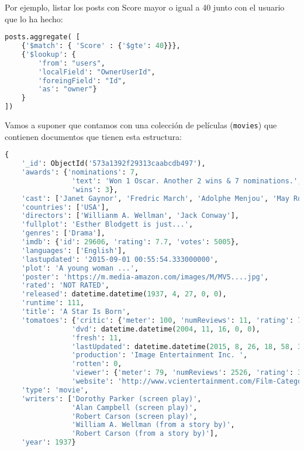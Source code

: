 Por ejemplo, listar los posts con Score mayor o igual a 40 junto con el usuario que lo ha hecho:
\begin{lstlisting}[language=python]
posts.aggregate( [
	{'$match': { 'Score' : {'$gte': 40}}},
	{'$lookup': {
		'from': "users",
		'localField': "OwnerUserId",
		'foreingField': "Id",
		'as': "owner"}
	}
])
\end{lstlisting}
Vamos a suponer que contamos con una colección de películas (\texttt{movies}) que contienen documentos que tienen esta estructura:
\begin{lstlisting}[language=python]
{
	'_id': ObjectId('573a1392f29313caabcdb497'),
	'awards': {'nominations': 7,
				'text': 'Won 1 Oscar. Another 2 wins & 7 nominations.',
				'wins': 3},
	'cast': ['Janet Gaynor', 'Fredric March', 'Adolphe Menjou', 'May Robson'],
	'countries': ['USA'],
	'directors': ['Willianm A. Wellman', 'Jack Conway'],
	'fullplot': 'Esther Blodgett is just...',
	'genres': ['Drama'],
	'imdb': {'id': 29606, 'rating': 7.7, 'votes': 5005},
	'languages': ['English'],
	'lastupdated': '2015-09-01 00:55:54.333000000',
	'plot': 'A young woman ...',
	'poster': 'https://m.media-amazon.com/images/M/MV5....jpg',
	'rated': 'NOT RATED',
	'released': datetime.datetime(1937, 4, 27, 0, 0),
	'runtime': 111,
	'title': 'A Star Is Born',
	'tomatoes': {'critic': {'meter': 100, 'numReviews': 11, 'rating': 7.4},
				'dvd': datetime.datetime(2004, 11, 16, 0, 0),
				'fresh': 11,
				'lastUpdated': datetime.datetime(2015, 8, 26, 18, 58, 34),
				'production': 'Image Entertainment Inc. ',
				'rotten': 0,
				'viewer': {'meter': 79, 'numReviews': 2526, 'rating': 3.6},
				'website': 'http://www.vcientertainment.com/Film-Categories?product_id=73'},
	'type': 'movie',
	'writers': ['Dorothy Parker (screen play)',
				'Alan Campbell (screen play)',
				'Robert Carson (screen play)',
				'William A. Wellman (from a story by)',
				'Robert Carson (from a story by)'],
	'year': 1937}
\end{lstlisting}